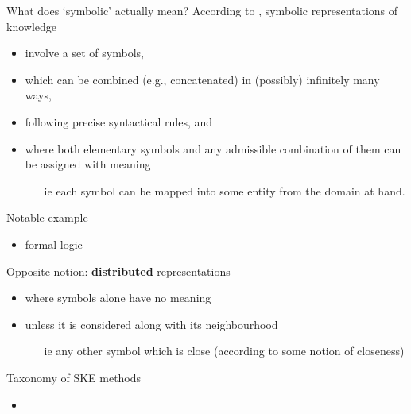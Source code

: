 \documentclass[presentation]{beamer}\mode<presentation>{\usetheme{AMSBolognaFC}}
\begin{document}
\begin{frame}[allowframebreaks]{What does `symbolic' actually mean?}
    According to \cite{Gelder90}, \alert{symbolic} representations of knowledge
    \begin{itemize}
        \item involve a \alert{set of symbols},
        \item which can be combined (e.g., concatenated) in (possibly) \alert{infinitely many} ways, 
        \item following precise \alert{syntactical} rules, and
        \item where both elementary symbols and any admissible combination of them can be assigned with \alert{meaning}
        \begin{itemize}
            \item[ie] \alert{each} symbol can be mapped into some entity from the domain at hand.
        \end{itemize}
    \end{itemize}
    
    \begin{exampleblock}{Notable example}
        \begin{itemize}
            \item formal logic
        \end{itemize}
    \end{exampleblock}

    \framebreak

    \begin{alertblock}{Opposite notion: \textbf{distributed} representations}
        \begin{itemize}
            \item where symbols \alert{alone} have no meaning
            \item unless it is considered along with its \alert{neighbourhood}
            \begin{itemize}
                \item[ie] any other symbol which is \alert{close} (according to some notion of closeness)
            \end{itemize}
        \end{itemize}
    \end{alertblock}
\end{frame}

\begin{frame}{Taxonomy of SKE methods}
    \begin{itemize}
        \item 
    \end{itemize}
\end{frame}
\end{document}

